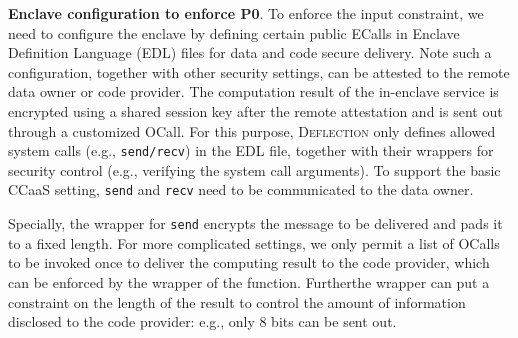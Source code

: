\vspace{3pt}\noindent\textbf{Enclave configuration to enforce P0}. 
To enforce the input constraint, we need to configure the enclave by defining certain public ECalls in Enclave Definition Language (EDL) files for data and code secure delivery. Note such a configuration, together with other security settings, can be attested to the remote data owner or code provider. The computation result of the in-enclave service is encrypted using a shared session key after the remote attestation and is sent out through a customized OCall. For this purpose, \textsc{Deflection} only defines allowed system calls (e.g., \texttt{send/recv}) in the EDL file, together with their wrappers for security control (e.g., verifying the system call arguments).
To support the basic CCaaS setting,  \texttt{send} and \texttt{recv} need to be communicated to the data owner. 
\DIFaddbegin 

\DIFaddend Specially, the wrapper for \texttt{send} encrypts the message to be delivered and pads it to a fixed length. For more complicated settings, we only permit a list of OCalls to be invoked once to deliver the computing result to the code provider, which can be enforced by the wrapper of the function. Further\DIFaddbegin \DIFadd{, }\DIFaddend the wrapper can put a constraint on the length of the result to control the amount of information disclosed to the code provider: e.g., only 8 bits can be sent out.


